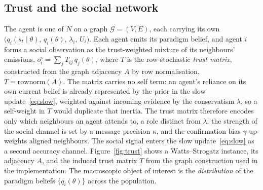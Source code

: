 \documentclass[11pt,a4paper]{article}
\newcommand{\theory}{\theta}
\begin{document}
\subsection{Trust and the social network}
\label{ssec:trust}

The agent is one of $N$ on a graph $\mathcal G=(V,E)$, each carrying its own
$\bigl(q_i(s_t\mid\theory),\,q_i(\theory),\,\lambda_i,\,U_i\bigr)$. Each agent emits
its paradigm belief, and agent $i$ forms a social observation as the trust-weighted
mixture of its neighbours' emissions, $o^{\mathrm s}_i=\sum_j T_{ij}\,q_j(\theory)$,
where $T$ is the row-stochastic \emph{trust matrix}, constructed from the graph
adjacency $A$ by row normalisation, $T=\mathrm{rownorm}(A)$. The matrix carries no
self term: an agent's reliance on its own current belief is already represented by
the prior in the slow update~\eqref{eq:slow}, weighted against incoming evidence by
the conservatism $\lambda$, so a self-weight in $T$ would duplicate that inertia.
The trust matrix therefore encodes only which neighbours an agent attends to, a role
distinct from $\lambda$; the strength of the social channel is set by a message
precision $\kappa$, and the confirmation bias $\gamma$ up-weights aligned
neighbours. The social signal enters the slow update~\eqref{eq:slow} as a second
accuracy channel. Figure~\ref{fig:trust} shows a Watts--Strogatz instance, its
adjacency $A$, and the induced trust matrix $T$ from the graph construction used in
the implementation. The macroscopic object of interest is the \emph{distribution} of
the paradigm beliefs $\{q_i(\theory)\}$ across the population.
\end{document}
